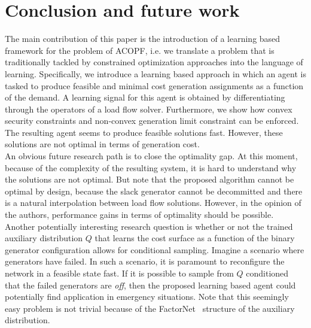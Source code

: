 \section{Conclusion and future work}
\label{sec:LOPFconclusion}
The main contribution of this paper is the introduction of a learning based framework for the problem of ACOPF, i.e. we translate a problem that is traditionally tackled by constrained optimization approaches into the language of learning. Specifically, we introduce a learning based approach in which an agent is tasked to produce feasible and minimal cost generation assignments as a function of the demand. A learning signal for this agent is obtained by differentiating through the operators of a load flow solver. Furthermore, we show how convex security constraints and non-convex generation limit constraint can be enforced. The resulting agent seems to produce feasible solutions fast. However, these solutions are not optimal in terms of generation cost.\\
An obvious future research path is to close the optimality gap. At this moment, because of the complexity of the resulting system, it is hard to understand why the solutions are not optimal. But note that the proposed algorithm cannot be optimal by design, because the slack generator cannot be decommitted and there is a natural interpolation between load flow solutions. However, in the opinion of the authors, performance gains in terms of optimality should be possible.\\
Another potentially interesting research question is whether or not the trained auxiliary distribution $Q$ that learns the cost surface as a function of the binary generator configuration allows for conditional sampling. Imagine a scenario where generators have failed. In such a scenario, it is paramount to reconfigure the network in a feasible state fast. If it is possible to sample from $Q$ conditioned that the failed generators are \emph{off}, then the proposed learning based agent could potentially find application in emergency situations. Note that this seemingly easy problem is not trivial because of the FactorNet~\cite{lange2018factornet} structure of the auxiliary distribution.\\
